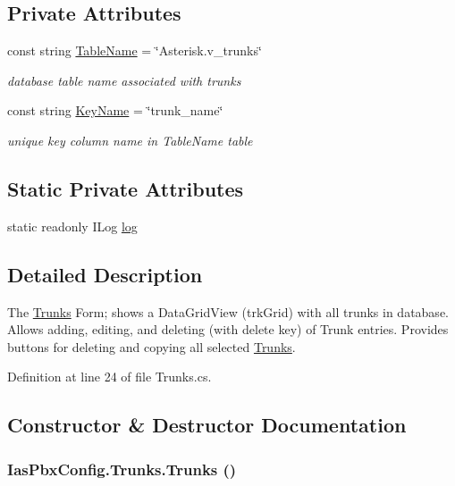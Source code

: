 \subsection*{Private Attributes}
\begin{DoxyCompactItemize}
\item 
const string \hyperlink{class_ias_pbx_config_1_1_trunks_ae79cf02106338e52ae7613b5dff2a705}{TableName} = \char`\"{}Asterisk.v\_\-trunks\char`\"{}
\begin{DoxyCompactList}\small\item\em database table name associated with trunks \item\end{DoxyCompactList}\item 
const string \hyperlink{class_ias_pbx_config_1_1_trunks_a399bf6ea5158c3c43fd2350be772fe45}{KeyName} = \char`\"{}trunk\_\-name\char`\"{}
\begin{DoxyCompactList}\small\item\em unique key column name in TableName table \item\end{DoxyCompactList}\end{DoxyCompactItemize}
\subsection*{Static Private Attributes}
\begin{DoxyCompactItemize}
\item 
static readonly ILog \hyperlink{class_ias_pbx_config_1_1_trunks_a1b85e00c7fd451b3a368edef2210df49}{log}
\end{DoxyCompactItemize}


\subsection{Detailed Description}
The \hyperlink{class_ias_pbx_config_1_1_trunks}{Trunks} Form; shows a DataGridView (trkGrid) with all trunks in database. Allows adding, editing, and deleting (with delete key) of Trunk entries. Provides buttons for deleting and copying all selected \hyperlink{class_ias_pbx_config_1_1_trunks}{Trunks}. 

Definition at line 24 of file Trunks.cs.

\subsection{Constructor \& Destructor Documentation}
\hypertarget{class_ias_pbx_config_1_1_trunks_a8cb3b643f7704d55d9b3857e064c0132}{
\subsubsection[{Trunks}]{\setlength{\rightskip}{0pt plus 5cm}IasPbxConfig.Trunks.Trunks ()}}
\label{class_ias_pbx_config_1_1_trunks_a8cb3b643f7704d55d9b3857e064c0132}


